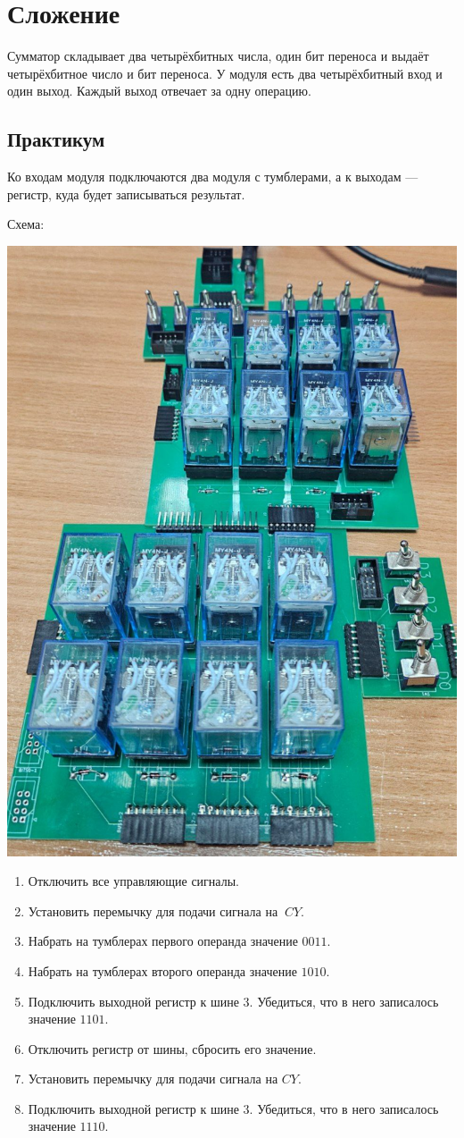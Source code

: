 \documentclass{book}
\begin{document}
\section{Сложение}

Сумматор складывает два четырёхбитных числа, один бит переноса и выдаёт четырёхбитное число и бит переноса.
У модуля есть два четырёхбитный вход и один выход.
Каждый выход отвечает за одну операцию.


\subsection{Практикум}

Ко входам модуля подключаются два модуля с тумблерами, а к выходам --- регистр,
куда будет записываться результат.

Схема:

\includegraphics[width=0.5\columnwidth]{photo/adder.jpg}

\begin{enumerate}
    \item Отключить все управляющие сигналы.
    \item Установить перемычку для подачи сигнала на $~CY$.
    \item Набрать на тумблерах первого операнда значение $0011$.
    \item Набрать на тумблерах второго операнда значение $1010$.
    \item Подключить выходной регистр к шине $3$. Убедиться, что в него записалось значение $1101$.
    \item Отключить регистр от шины, сбросить его значение.
    \item Установить перемычку для подачи сигнала на $CY$.
    \item Подключить выходной регистр к шине $3$. Убедиться, что в него записалось значение $1110$.
\end{enumerate}
\end{document}

